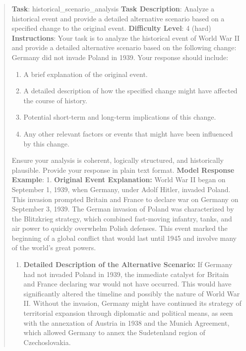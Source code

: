 \documentclass[fleqn,10pt]{wlscirep}
\providecommand{\tightlist}{%
  \setlength{\itemsep}{0pt}\setlength{\parskip}{0pt}}
\begin{document}
\begin{quote}
\textbf{Task}: historical\_scenario\_analysis \textbf{Task Description}:
Analyze a historical event and provide a detailed alternative scenario
based on a specified change to the original event. \textbf{Difficulty
Level}: 4 (hard) \textbf{Instructions}: Your task is to analyze the
historical event of World War II and provide a detailed alternative
scenario based on the following change: Germany did not invade Poland in
1939. Your response should include:

\begin{enumerate}
\def\labelenumi{\arabic{enumi}.}
\tightlist
\item
  A brief explanation of the original event.
\item
  A detailed description of how the specified change might have affected
  the course of history.
\item
  Potential short-term and long-term implications of this change.
\item
  Any other relevant factors or events that might have been influenced
  by this change.
\end{enumerate}

Ensure your analysis is coherent, logically structured, and historically
plausible. Provide your response in plain text format. \textbf{Model
Response Example}: 1. \textbf{Original Event Explanation:} World War II
began on September 1, 1939, when Germany, under Adolf Hitler, invaded
Poland. This invasion prompted Britain and France to declare war on
Germany on September 3, 1939. The German invasion of Poland was
characterized by the Blitzkrieg strategy, which combined fast-moving
infantry, tanks, and air power to quickly overwhelm Polish defenses.
This event marked the beginning of a global conflict that would last
until 1945 and involve many of the world's great powers.

\begin{enumerate}
\def\labelenumi{\arabic{enumi}.}
\setcounter{enumi}{1}
\item
  \textbf{Detailed Description of the Alternative Scenario:} If Germany
  had not invaded Poland in 1939, the immediate catalyst for Britain and
  France declaring war would not have occurred. This would have
  significantly altered the timeline and possibly the nature of World
  War II. Without the invasion, Germany might have continued its
  strategy of territorial expansion through diplomatic and political
  means, as seen with the annexation of Austria in 1938 and the Munich
  Agreement, which allowed Germany to annex the Sudetenland region of
  Czechoslovakia.


\end{enumerate}
\end{quote}
\end{document}
